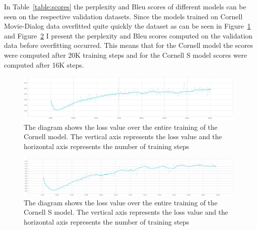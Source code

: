 \documentclass[12pt]{article}
\begin{document}
In Table~\ref{table:scores} the perplexity and Bleu scores of different models can be seen on the respective validation datasets. Since the models trained on Cornell Movie-Dialog data overfitted quite quickly the dataset as can be seen in Figure~\ref{CornellOverfit} and Figure~\ref{CornellSOverfit} I present the perplexity and Bleu scores computed on the validation data before overfitting occurred. This means that for the Cornell model the scores were computed after 20K training steps and for the Cornell S model scores were computed after 16K steps.

\begin{figure}[H] 
	\centering
	\includegraphics[width=1.0\textwidth]{pics/cornell_loss.png}
	\caption{The diagram shows the loss value over the entire training of the Cornell model. The vertical axis represents the loss value and the horizontal axis represents the number of training steps}
	\label{CornellOverfit}
\end{figure}
\begin{figure}[H] 
	\centering
	\includegraphics[width=1.0\textwidth]{pics/cornell_speakers_loss.png}
	\caption{The diagram shows the loss value over the entire training of the Cornell S model. The vertical axis represents the loss value and the horizontal axis represents the number of training steps}
	\label{CornellSOverfit}
\end{figure}
\end{document}

